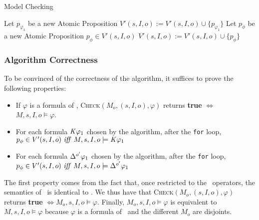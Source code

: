 \begin{algorithm}[h]
  \caption{Model Checking \ctlskd}
  \begin{algorithmic}[1]
    \State Let $p_{\varphi_1}$ be a new Atomic Proposition
    \State $V'(s,I,o):=V'(s,I,o)\cup\{p_{\varphi_1}\}$
    \EndIf
    \EndFor
    \State Let $p_{\phi}$ be a new Atomic Proposition
    \State $p_{\phi}\in V'(s,I,o)$
    \EndIf
    \EndFor
    \EndIf
    \State $V'(s,I,o):=V'(s,I,o)\cup\{p_{\phi}\}$
    \EndIf
    \EndFor
    \EndIf
    \State{}
    \Else \State{}
    \EndIf
    \EndFunction     
  \end{algorithmic}
  \label{algo}
\end{algorithm}

\subsubsection{Algorithm Correctness}
To be convinced of the correctness of the algorithm, it suffices to prove the following properties:
\begin{itemize}
\item If $\varphi$ is a formula of \ctls, \textsc{Check}\ctls$(M_o,(s,I,o),\varphi)$ returns \textbf{true} $\iff$ $M,s,I,o\models\varphi$.
\item For each formula $\mathit{K}\varphi_1$ chosen by the algorithm, after the \texttt{for} loop, $p_{\phi}\in V'(s,I,o)\ \mathit{iff}\  M,s,I,o\models\mathit{K}\varphi_1$
\item For each formula $\Delta^{o'}\varphi_1$ chosen by the algorithm, after the \texttt{for} loop, $p_{\phi}\in V'(s,I,o)\ \mathit{iff}\  M,s,I,o\models\Delta^{o'}\varphi_1$
\end{itemize}

The first property comes from the fact that, once restricted to the \ctls\ operators, the semantics of \ctlskd\ is identical to \ctls.
We thus have that \textsc{Check}\ctls$(M_o,(s,I,o),\varphi)$ returns \textbf{true} $\iff M_o,s,I,o\models\varphi$. Finally, $M_o,s,I,o\models\varphi$ is equivalent to $M,s,I,o\models\varphi$ because $\varphi$ is a formula of \ctls\ and the different $M_o$ are disjoints.


